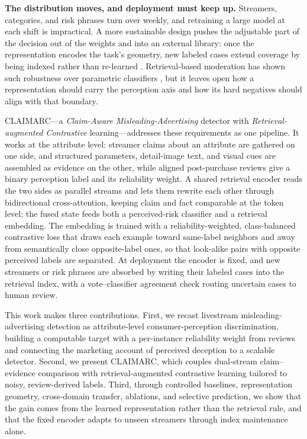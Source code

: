 \documentclass[letterpaper]{article}
\begin{document}
\textbf{The distribution moves, and deployment must keep up.} Streamers, categories, and risk phrases turn over weekly, and retraining a large model at each shift is impractical. A more sustainable design pushes the adjustable part of the decision out of the weights and into an external library: once the representation encodes the task's geometry, new labeled cases extend coverage by being indexed rather than re-learned \citep{mei2024rgcl,mei2025rahmd}. Retrieval-based moderation has shown such robustness over parametric classifiers \citep{wang2025moderation,long2023retrievalicl}, but it leaves open how a representation should carry the perception axis and how its hard negatives should align with that boundary.

CLAIMARC---a \emph{Claim-Aware Misleading-Advertising} detector with \emph{Retrieval-augmented Contrastive} learning---addresses these requirements as one pipeline. It works at the attribute level: streamer claims about an attribute are gathered on one side, and structured parameters, detail-image text, and visual cues are assembled as evidence on the other, while aligned post-purchase reviews give a binary perception label and its reliability weight. A shared retrieval encoder reads the two sides as parallel streams and lets them rewrite each other through bidirectional cross-attention, keeping claim and fact comparable at the token level; the fused state feeds both a perceived-risk classifier and a retrieval embedding. The embedding is trained with a reliability-weighted, class-balanced contrastive loss that draws each example toward same-label neighbors and away from semantically close opposite-label ones, so that look-alike pairs with opposite perceived labels are separated. At deployment the encoder is fixed, and new streamers or risk phrases are absorbed by writing their labeled cases into the retrieval index, with a vote--classifier agreement check routing uncertain cases to human review.

This work makes three contributions. First, we recast livestream misleading-advertising detection as attribute-level consumer-perception discrimination, building a computable target with a per-instance reliability weight from reviews and connecting the marketing account of perceived deception to a scalable detector. Second, we present CLAIMARC, which couples dual-stream claim--evidence comparison with retrieval-augmented contrastive learning tailored to noisy, review-derived labels. Third, through controlled baselines, representation geometry, cross-domain transfer, ablations, and selective prediction, we show that the gain comes from the learned representation rather than the retrieval rule, and that the fixed encoder adapts to unseen streamers through index maintenance alone.
\end{document}
